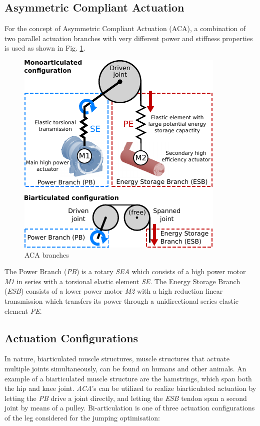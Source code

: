 \documentclass[letterpaper, 10 pt, conference]{ieeeconf}  %
\begin{document}
	\subsection{Asymmetric Compliant Actuation}
	
	For the concept of Asymmetric Compliant Actuation (ACA), a combination of two parallel actuation branches with very different power and stiffness properties is used as shown in Fig. \ref{fig:ACA}.
	
	
	
	\begin{figure}[b]
		\centering
		\includegraphics[scale=1.0]{actuationConcept}
		\caption{ACA branches}
		\label{fig:ACA}
	\end{figure}
	
	The Power Branch (\textit{PB}) is a rotary \textit{SEA} which consists of a high power motor \textit{M1} in series with a torsional elastic element \textit{SE}. The Energy Storage Branch (\textit{ESB}) consists of a lower power motor \textit{M2} with a high reduction linear transmission which transfers its power through a unidirectional series elastic element \textit{PE}.
	
	\subsection{Actuation Configurations}
	In nature, biarticulated muscle structures, muscle structures that actuate multiple joints simultaneously, can be found on humans and other animals. An example of a biarticulated muscle structure are the hamstrings, which span both the hip and knee joint. \textit{ACA}'s can be utilized to realize biarticulated actuation by letting the \textit{PB} drive a joint directly, and letting the \textit{ESB} tendon span a second joint by means of a pulley. Bi-articulation is one of three actuation configurations of the leg considered for the jumping optimisation:
	
\end{document}
